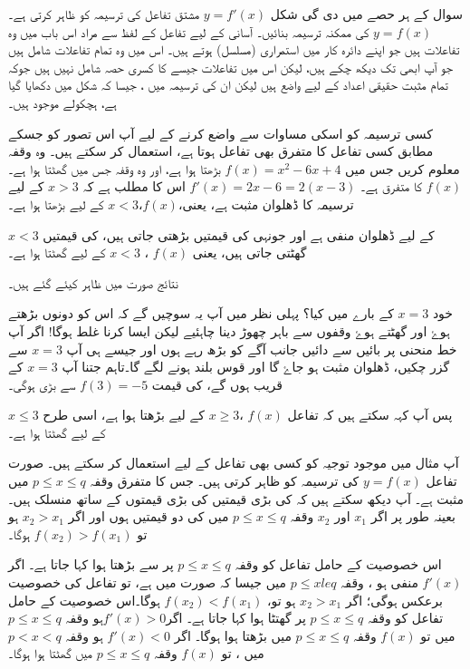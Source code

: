 سوال کے ہر حصے میں دی گی شکل \(y=f'(x)\) مشتق تفاعل کی ترسیمہ کو ظاہر کرتی ہے۔ \(y=f(x)\) کی ممکنہ ترسیمہ بنائیں۔
آسانی کے لیے تفاعل کے لفظ سے مراد اس باب میں وہ تفاعلات ہیں جو اپنے دائرہ کار میں استمراری (مسلسل) ہوتے ہیں۔ اس میں وہ تمام  تفاعلات شامل ہیں جو آپ ابھی تک دیکھ چکے ہیں، لیکن اس میں تفاعلات جیسے   کا کسری حصہ شامل نہیں ہیں جوکہ تمام مثبت حقیقی اعداد کے لیے واضع ہیں لیکن ان کی ترسیمہ میں ، جیسا کہ شکل   میں دکھایا گیا ہے، ہچکولے موجود ہیں۔

کسی ترسیمہ کو اسکی مساوات سے واضع کرنے کے لیے آپ اس تصور کو جسکے مطابق کسی تفاعل کا متفرق بھی تفاعل ہوتا ہے، استعمال کر سکتے ہیں۔
وہ وقفہ معلوم کریں جس میں \(f(x)=x^2-6x+4\) بڑھتا ہوا ہے، اور وہ وقفہ جس میں گھٹتا ہوا ہے۔ \(f(x)\) کا متفرق ہے۔ \(f'(x)=2x-6=2(x-3)\) اس کا مطلب ہے کہ \(x>3\) کے لیے ترسیمہ کا ڈھلوان مثبت ہے، یعنی،\(f(x)\)،\(x<3\) کے لیے بڑھتا ہوا ہے۔

   \(x<3\)  
 کے لیے ڈھلوان منفی ہے اور جونہی   کی قیمتیں بڑھتی جاتی ہیں،   کی قیمتیں گھٹتی جاتی ہیں، یعنی  \(f(x)\)  ، \(x<3\) کے لیے گھٹتا ہوا ہے۔ 

نتائج صورت  میں ظاہر کیئے گئے ہیں۔

خود \(x=3\) کے بارے میں کیا؟ پہلی نظر میں آپ یہ سوچیں گے کہ اس کو دونوں بڑھتے ہوۓ اور گھٹتے ہوۓ وقفوں سے باہر چھوڑ دینا چاہئیے لیکن ایسا کرنا غلط ہوگا! اگر آپ خط منحنی پر بائیں سے دائیں جانب آگے کو بڑھ رہے ہوں اور جیسے ہی آپ \(x=3\) سے گزر چکیں، ڈھلوان مثبت ہو جاۓ گا اور قوس بلند ہونے لگے گا۔تاہم جتنا آپ \(x=3\) کے قریب ہوں گے،   کی قیمت \(f(3)=-5\) سے بڑی ہوگی۔ 

پس آپ کہہ سکتے ہیں کہ تفاعل   \(f(x)\) ،\(x \geq 3\) کے لیے بڑھتا ہوا ہے، اسی طرح \(x \leq 3\)کے لیے گھٹتا ہوا ہے۔

آپ مثال   میں موجود توجیہ کو کسی بھی تفاعل کے لیے استعمال کر سکتے ہیں۔ صورت   تفاعل \(y=f(x)\) کی ترسیمہ کو ظاہر کرتی ہیں۔ جس کا متفرق وقفہ \(p \leq x \leq q\) میں مثبت ہے۔ آپ دیکھ سکتے ہیں کہ  کی بڑی قیمتیں کی بڑی قیمتوں کے ساتھ منسلک ہیں۔ بعینہ طور پر اگر \(x_1\) اور \(x_2\) وقفہ \(p \leq x \leq q\) میں  کی دو قیمتیں ہوں اور اگر \(x_2 > x_1\) ہو تو \(f(x_2) > f(x_1)\) ہوگا۔

اس خصوصیت کے حامل تفاعل کو وقفہ \(p \leq x \leq q\) پر سے بڑھتا ہوا کہا جاتا ہے۔ اگر \(f'(x)\) منفی ہو ، وقفہ  \(p\le xle q\) میں جیسا کہ صورت   میں ہے، تو تفاعل کی خصوصیت برعکس ہوگی؛ اگر  \(x_2 > x_1\) ہو تو، \(f(x_2) < f(x_1)\) ہوگا۔اس خصوصیت کے حامل تفاعل کو وقفہ \(p \leq x \leq q\) پر گھتٹا ہوا کہا جاتا ہے۔
اگر\(f'(x)>0\)ہو  وقفہ \(p \leq x \leq q\) میں تو   \(f(x)\)   وقفہ \(p \leq x \leq q\)  میں بڑھتا ہوا ہوگا۔
اگر  \(f'(x)<0\) ہو وقفہ \(p<x<q\) میں ، تو \(f(x)\) وقفہ \(p \leq x \leq q\) میں گھٹتا ہوا ہوگا۔

